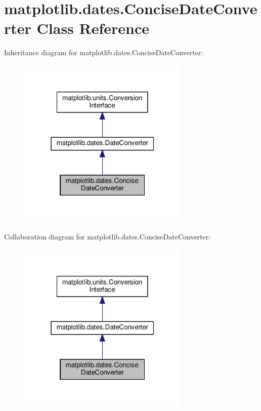 \hypertarget{classmatplotlib_1_1dates_1_1ConciseDateConverter}{}\section{matplotlib.\+dates.\+Concise\+Date\+Converter Class Reference}
\label{classmatplotlib_1_1dates_1_1ConciseDateConverter}


Inheritance diagram for matplotlib.\+dates.\+Concise\+Date\+Converter\+:
\nopagebreak
\begin{figure}[H]
\begin{center}
\leavevmode
\includegraphics[width=232pt]{classmatplotlib_1_1dates_1_1ConciseDateConverter__inherit__graph}
\end{center}
\end{figure}


Collaboration diagram for matplotlib.\+dates.\+Concise\+Date\+Converter\+:
\nopagebreak
\begin{figure}[H]
\begin{center}
\leavevmode
\includegraphics[width=232pt]{classmatplotlib_1_1dates_1_1ConciseDateConverter__coll__graph}
\end{center}
\end{figure}
